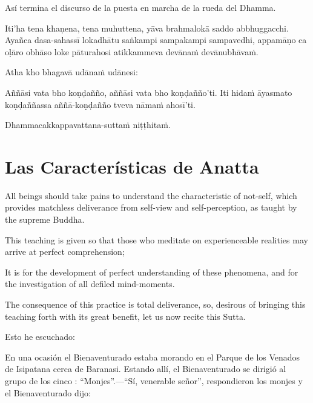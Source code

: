 Así termina el discurso de la puesta en marcha de la rueda del Dhamma.

\clearpage

\paliText
\markboth{\paliTitle}{\rightmark}

Iti'ha tena khaṇena, tena muhuttena, yāva brahmalokā saddo abbhuggacchi.
Ayañca dasa-sahassī lokadhātu saṅkampi sampakampi sampavedhi, appamāṇo ca
oḷāro obhāso loke pāturahosi atikkammeva devānaṁ devānubhāvaṁ.

Atha kho bhagavā udānaṁ udānesi:

Aññāsi vata bho koṇḍañño, aññāsi vata bho koṇḍañño'ti. Iti hidaṁ āyasmato
koṇḍaññassa aññā-koṇḍañño tveva nāmaṁ ahosī'ti.

Dhammacakkappavattana-suttaṁ niṭṭhitaṁ.

\chapterTocDelegatePageNumber
\chapter{Las Características de Anatta}

\setTocDelegatedPageNumber
\englishText
\renewcommand{\englishTitle}{Las Características de Anatta}

\begin{leader}

All beings should take pains to understand the characteristic of
not-self, which provides matchless deliverance from self-view and
self-perception, as taught by the supreme Buddha.

This teaching is given so that those who meditate on experienceable
realities may arrive at perfect comprehension;

It is for the development of perfect understanding of these phenomena,
and for the investigation of all defiled mind-moments.

The consequence of this practice is total deliverance, so, desirous of
bringing this teaching forth with its great benefit, let us now recite
this Sutta.

\end{leader}

Esto he escuchado:

En una ocasión el Bienaventurado estaba morando en el Parque de los Venados de Isipatana cerca de Baranasi. Estando allí, el Bienaventurado se dirigió al grupo de los cinco : “Monjes”.—“Sí, venerable señor”, respondieron los monjes y el Bienaventurado dijo:

